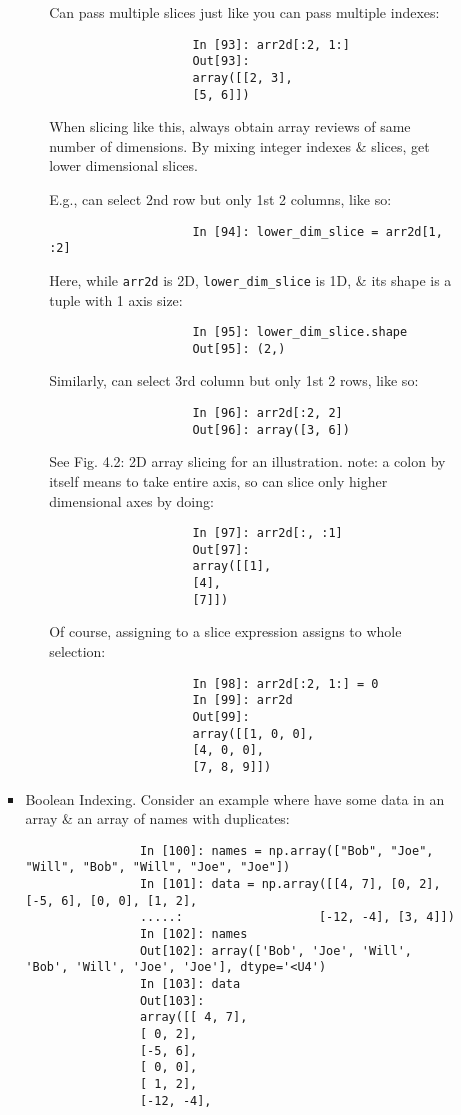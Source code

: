 \documentclass{article}
\begin{document}
\begin{itemize}
\begin{itemize}
\begin{itemize}
\begin{itemize}
				Can pass multiple slices just like you can pass multiple indexes:
				\begin{verbatim}
					In [93]: arr2d[:2, 1:]
					Out[93]:
					array([[2, 3],
					[5, 6]])
				\end{verbatim}
				When slicing like this, always obtain array reviews of same number of dimensions. By mixing integer indexes \& slices, get lower dimensional slices.
				
				E.g., can select 2nd row but only 1st 2 columns, like so:
				\begin{verbatim}
					In [94]: lower_dim_slice = arr2d[1, :2]
				\end{verbatim}
				Here, while {\tt arr2d} is 2D, \verb|lower_dim_slice| is 1D, \& its shape is a tuple with 1 axis size:
				\begin{verbatim}
					In [95]: lower_dim_slice.shape
					Out[95]: (2,)
				\end{verbatim}
				Similarly, can select 3rd column but only 1st 2 rows, like so:
				\begin{verbatim}
					In [96]: arr2d[:2, 2]
					Out[96]: array([3, 6])
				\end{verbatim}
				See {\sf Fig. 4.2: 2D array slicing} for an illustration. note: a colon by itself means to take entire axis, so can slice only higher dimensional axes by doing:
				\begin{verbatim}
					In [97]: arr2d[:, :1]
					Out[97]:
					array([[1],
					[4],
					[7]])
				\end{verbatim}
				Of course, assigning to a slice expression assigns to whole selection:
				\begin{verbatim}
					In [98]: arr2d[:2, 1:] = 0
					In [99]: arr2d
					Out[99]:
					array([[1, 0, 0],
					[4, 0, 0],
					[7, 8, 9]])
				\end{verbatim}
			\end{itemize}
			\item {\sf Boolean Indexing.} Consider an example where have some data in an array \& an array of names with duplicates:
			\begin{verbatim}
				In [100]: names = np.array(["Bob", "Joe", "Will", "Bob", "Will", "Joe", "Joe"])
				In [101]: data = np.array([[4, 7], [0, 2], [-5, 6], [0, 0], [1, 2],
				.....:                   [-12, -4], [3, 4]])
				In [102]: names
				Out[102]: array(['Bob', 'Joe', 'Will', 'Bob', 'Will', 'Joe', 'Joe'], dtype='<U4')
				In [103]: data
				Out[103]:
				array([[ 4, 7],
				[ 0, 2],
				[-5, 6],
				[ 0, 0],
				[ 1, 2],
				[-12, -4],

\end{verbatim}
\end{itemize}
\end{itemize}
\end{itemize}
\end{document}
